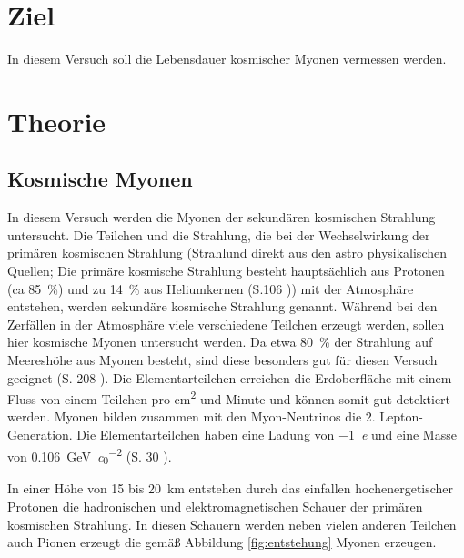\section{Ziel}
In diesem Versuch soll die Lebensdauer kosmischer Myonen vermessen werden.
\setcounter{page}{1}
\section{Theorie}
\label{sec:Theorie}
\subsection{Kosmische Myonen}
\label{sec:myonen}
In diesem Versuch werden die Myonen der sekundären kosmischen Strahlung untersucht.
Die Teilchen und die Strahlung, die bei der Wechselwirkung der primären kosmischen Strahlung (Strahlund direkt aus den astro physikalischen Quellen; Die primäre kosmische Strahlung besteht hauptsächlich aus Protonen (ca \SI{85}{\percent}) und zu \SI{14}{\percent} aus Heliumkernen (S.\num{106} \cite{source1})) mit der Atmosphäre entstehen, werden sekundäre kosmische Strahlung genannt.
Während bei den Zerfällen in der Atmosphäre viele verschiedene Teilchen erzeugt werden, sollen hier kosmische Myonen untersucht werden.
Da etwa \SI{80}{\percent} der Strahlung auf Meereshöhe aus Myonen besteht, sind diese besonders gut für diesen Versuch geeignet (S. \num{208} \cite{source1}).
Die Elementarteilchen erreichen die Erdoberfläche mit einem Fluss von einem Teilchen pro \si{\square \centi \metre} und Minute und können somit gut detektiert werden.
Myonen bilden zusammen mit den Myon-Neutrinos die 2. Lepton-Generation.
Die Elementarteilchen haben eine Ladung von \SI{-1}{\elementarycharge} und eine Masse von \SI[per-mode=symbol]{0.106}{\giga \eV \per \clight \squared} (S. \num{30} \cite{source1}).

In einer Höhe von \num{15} bis \SI{20}{\kilo\metre} entstehen durch das einfallen hochenergetischer Protonen die hadronischen und elektromagnetischen Schauer der primären kosmischen Strahlung.
In diesen Schauern werden neben vielen anderen Teilchen auch Pionen erzeugt die gemäß Abbildung \ref{fig:entstehung} Myonen erzeugen.

